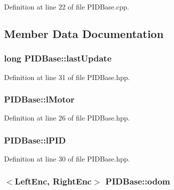 Definition at line 22 of file P\-I\-D\-Base.\-cpp.



\subsection{Member Data Documentation}
\hypertarget{classPIDBase_a9ac4b3515239d988dae8ebc95dc09ed5}{
\subsubsection[{last\-Update}]{\setlength{\rightskip}{0pt plus 5cm}long P\-I\-D\-Base\-::last\-Update\hspace{0.3cm}{\ttfamily [private]}}}\label{classPIDBase_a9ac4b3515239d988dae8ebc95dc09ed5}


Definition at line 31 of file P\-I\-D\-Base.\-hpp.

\hypertarget{classPIDBase_a344ca2736e618d42445d568d038be7d9}{
\subsubsection[{l\-Motor}]{ P\-I\-D\-Base\-::l\-Motor\hspace{0.3cm}{\ttfamily [private]}}}\label{classPIDBase_a344ca2736e618d42445d568d038be7d9}


Definition at line 26 of file P\-I\-D\-Base.\-hpp.

\hypertarget{classPIDBase_a7e39df880dd6279479e77febe800a6ba}{
\subsubsection[{l\-P\-I\-D}]{ P\-I\-D\-Base\-::l\-P\-I\-D\hspace{0.3cm}{\ttfamily [private]}}}\label{classPIDBase_a7e39df880dd6279479e77febe800a6ba}


Definition at line 30 of file P\-I\-D\-Base.\-hpp.

\hypertarget{classPIDBase_a3adee9b84ba975616f672a7620ac16b8}{
\subsubsection[{odom}]{$<${\bf Left\-Enc}, {\bf Right\-Enc}$>$ P\-I\-D\-Base\-::odom\hspace{0.3cm}{\ttfamily [private]}}}\label{classPIDBase_a3adee9b84ba975616f672a7620ac16b8}


